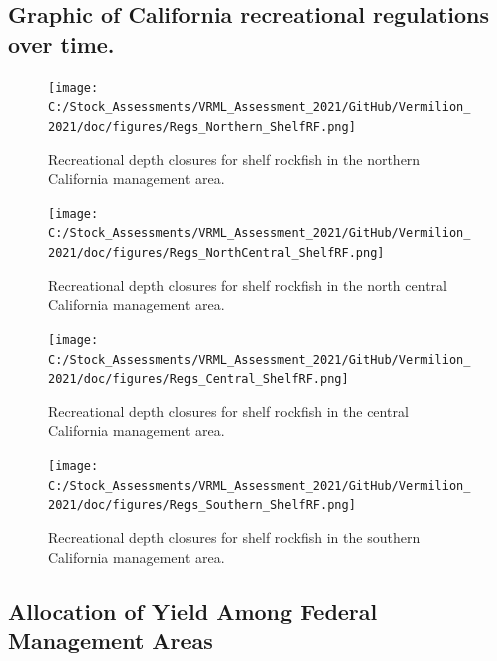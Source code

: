 \documentclass[
  english,
  a4paper,
]{article}
\begin{document}
\clearpage

\begin{landscape}

\subsection{Graphic of California recreational regulations over time.}

\begin{figure}
\texttt{[image: C:/Stock\_Assessments/VRML\_Assessment\_2021/GitHub/Vermilion\_2021/doc/figures/Regs\_Northern\_ShelfRF.png]}
\caption{Recreational depth closures for shelf rockfish in the northern California management area.\label{fig:rec-reg-n}}
\end{figure}

\FloatBarrier

\begin{figure}
\texttt{[image: C:/Stock\_Assessments/VRML\_Assessment\_2021/GitHub/Vermilion\_2021/doc/figures/Regs\_NorthCentral\_ShelfRF.png]}
\caption{Recreational depth closures for shelf rockfish in the north central California management area.\label{fig:rec-reg-cn}}
\end{figure}

\FloatBarrier

\begin{figure}
\texttt{[image: C:/Stock\_Assessments/VRML\_Assessment\_2021/GitHub/Vermilion\_2021/doc/figures/Regs\_Central\_ShelfRF.png]}
\caption{Recreational depth closures for shelf rockfish in the central California management area.\label{fig:rec-reg-cs}}
\end{figure}


\begin{figure}
\texttt{[image: C:/Stock\_Assessments/VRML\_Assessment\_2021/GitHub/Vermilion\_2021/doc/figures/Regs\_Southern\_ShelfRF.png]}
\caption{Recreational depth closures for shelf rockfish in the southern California management area.\label{fig:rec-reg-s}}
\end{figure}


\end{landscape}

\clearpage

\clearpage

\hypertarget{allocation-of-yield-among-federal-management-areas}{%
\subsection{Allocation of Yield Among Federal Management Areas}\label{allocation-of-yield-among-federal-management-areas}}
\end{document}
